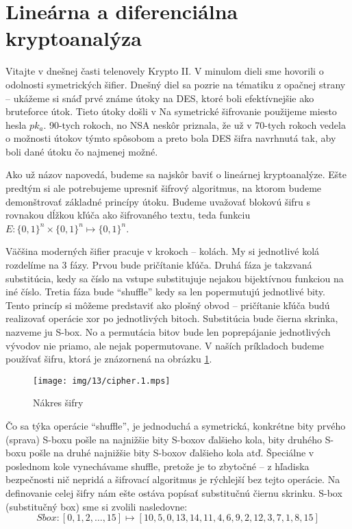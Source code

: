 \section{Lineárna a diferenciálna kryptoanalýza}

Vitajte v dnešnej časti telenovely Krypto II. V minulom dieli sme
hovorili o odolnosti symetrických šifier. Dnešný diel sa pozrie na
tématiku z opačnej strany -- ukážeme si snáď prvé známe útoky na DES,
ktoré boli efektívnejšie ako bruteforce útok. Tieto útoky došli v
Na symetrické šifrovanie použijeme miesto hesla $pk_a$.
90-tych rokoch, no NSA neskôr priznala, že už v 70-tych rokoch vedela
o možnosti útokov týmto spôsobom a preto bola DES šifra navrhnutá tak,
aby boli dané útoku čo najmenej možné.

Ako už názov napovedá, budeme sa najskôr baviť o lineárnej
kryptoanalýze. Ešte predtým si ale potrebujeme upresniť šifrový
algoritmus, na ktorom budeme demonštrovať základné princípy útoku.
Budeme uvažovať blokovú šifru s rovnakou dĺžkou kľúča ako šifrovaného
textu, teda funkciu $E:\{0,1\}^n \times \{0,1\}^n \mapsto \{0,1\}^n$.

Väčšina moderných šifier pracuje v krokoch -- kolách.
My si jednotlivé kolá rozdelíme na 3 fázy. Prvou bude pričítanie
kľúča.
Druhá fáza je takzvaná substitúcia, kedy sa číslo na vstupe substitujuje
nejakou bijektívnou funkciou na iné číslo.
Tretia fáza bude ``shuffle'' kedy sa len popermutujú jednotlivé bity.
Tento princíp si môžeme predstaviť ako plošný obvod -- pričítanie
kľúča budú realizovať operácie xor po jednotlivých bitoch.
Substitúcia bude čierna skrinka, nazveme ju S-box. No a permutácia
bitov bude len poprepájanie jednotlivých vývodov nie priamo, ale nejak
popermutovane. V naších príkladoch budeme používať šifru, ktorá je
znázornená na obrázku \ref{fig:cipher}.

\begin{figure}[h]
    \centering
    \texttt{[image: img/13/cipher.1.mps]}
    \label{fig:cipher}
    \caption{Nákres šifry}
\end{figure}

Čo sa týka operácie ``shuffle'', je jednoduchá a symetrická, konkrétne
bity prvého (sprava) S-boxu pošle na najnižšie bity S-boxov ďalšieho kola,
bity druhého S-boxu pošle na druhé najnižšie bity S-boxov ďalšieho
kola atď. Špeciálne v poslednom kole vynechávame shuffle, pretože je
to zbytočné -- z hľadiska bezpečnosti nič nepridá a šifrovací
algoritmus je rýchlejší bez tejto operácie. Na definovanie celej šifry
nám ešte ostáva popísať substitučnú čiernu skrinku.
S-box (substitučný box) sme si zvolili nasledovne:
\begin{equation*}
    Sbox:[0,1,2,\dots,15] \mapsto
    [10, 5, 0, 13, 14, 11, 4, 6, 9, 2, 12, 3, 7, 1, 8, 15]
\end{equation*}

